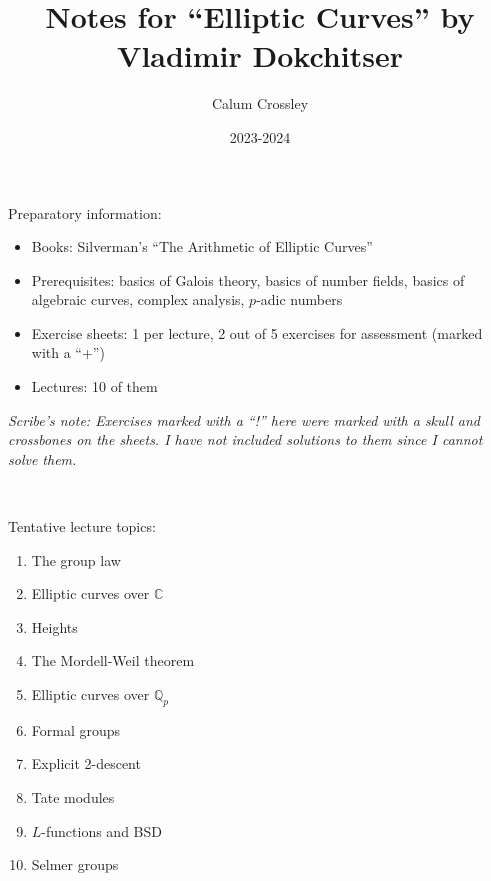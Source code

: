 \documentclass[a4paper]{article}
\title{Notes for ``Elliptic Curves'' by Vladimir Dokchitser}
\author{Calum Crossley}
\date{2023-2024}
\theoremstyle{plain}
\theoremstyle{remark}
\theoremstyle{definition}
\newcommand{\Q}{\mathbb{Q}}
\newcommand{\C}{\mathbb{C}}
\begin{document}
\maketitle

Preparatory information:
\begin{itemize}
    \item Books: Silverman's ``The Arithmetic of Elliptic Curves''
    \item Prerequisites: basics of Galois theory, basics of number fields,
        basics of algebraic curves, complex analysis, $p$-adic numbers
    \item Exercise sheets: 1 per lecture, 2 out of 5 exercises for assessment
        (marked with a ``+'')
    \item Lectures: 10 of them
\end{itemize}

\textit{Scribe's note: Exercises marked with a ``!'' here were marked with a
    skull and crossbones on the sheets. I have not included solutions to them
    since I cannot solve them.}

~

Tentative lecture topics:
\begin{enumerate}[label=\arabic*)]
    \item The group law
    \item Elliptic curves over $\C$
    \item Heights
    \item The Mordell-Weil theorem
    \item Elliptic curves over $\Q_p$
    \item Formal groups
    \item Explicit 2-descent
    \item Tate modules
    \item $L$-functions and BSD
    \item Selmer groups
\end{enumerate}
\end{document}

